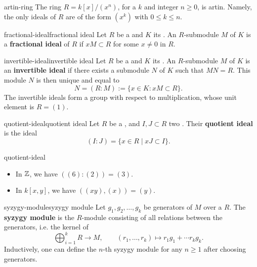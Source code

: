 \begin{example}{artin-ring}
    The ring $R = k[x] / (x^n)$, for a  $k$ and integer $n \ge 0$, is artin. Namely, the only ideals of $R$ are of the form $(x^k)$ with $0 \le k \le n$. 
\end{example}

\begin{topic}{fractional-ideal}{fractional ideal}
    Let $R$ be a  and $K$ its . An $R$-submodule $M$ of $K$ is a \textbf{fractional ideal} of $R$ if $xM \subset R$ for some $x \ne 0$ in $R$.
\end{topic}

\begin{topic}{invertible-ideal}{invertible ideal}
    Let $R$ be a  and $K$ its . An $R$-submodule $M$ of $K$ is an \textbf{invertible ideal} if there exists a submodule $N$ of $K$ such that $MN = R$. This module $N$ is then unique and equal to
    \[ N = (R : M) := \{ x \in K : xM \subset R \} . \]
    The invertible ideals form a group with respect to multiplication, whose unit element is $R = (1)$.
\end{topic}

\begin{topic}{quotient-ideal}{quotient ideal}
    Let $R$ be a , and $I, J \subset R$ two . Their \textbf{quotient ideal} is the ideal
    \[ (I : J) = \{ x \in R \;|\; xJ \subset I \} . \]
\end{topic}

\begin{example}{quotient-ideal}
    \begin{itemize}
        \item In $\mathbb{Z}$, we have $((6) : (2)) = (3)$.
        \item In $k[x, y]$, we have $((xy), (x)) = (y)$.
    \end{itemize}
\end{example}

\begin{topic}{syzygy-module}{syzygy module}
    Let $g_1, g_2, \ldots, g_k$ be generators of  $M$ over a  $R$. The \textbf{syzygy module} is the $R$-module consisting of all relations between the generators, i.e. the kernel of
    \[ \bigoplus_{i = 1}^{k} R \to M, \qquad (r_1, \ldots, r_k) \mapsto r_1 g_1 + \cdots r_k g_k . \]
    Inductively, one can define the $n$-th syzygy module for any $n \ge 1$ after choosing generators.
\end{topic}

